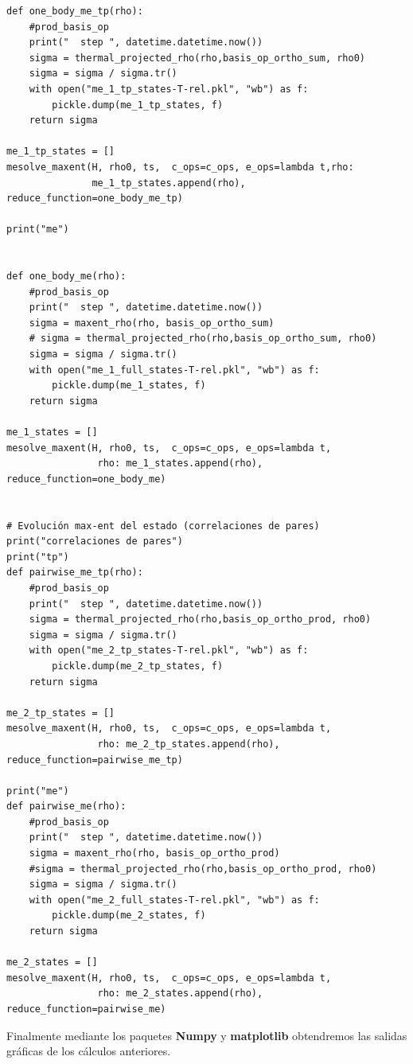 \documentclass{report} %
\numberwithin{equation}{section}
\begin{document}
\begin{verbatim}
def one_body_me_tp(rho):
    #prod_basis_op
    print("  step ", datetime.datetime.now())
    sigma = thermal_projected_rho(rho,basis_op_ortho_sum, rho0)
    sigma = sigma / sigma.tr()
    with open("me_1_tp_states-T-rel.pkl", "wb") as f:
        pickle.dump(me_1_tp_states, f)
    return sigma

me_1_tp_states = []
mesolve_maxent(H, rho0, ts,  c_ops=c_ops, e_ops=lambda t,rho:
               me_1_tp_states.append(rho), reduce_function=one_body_me_tp)

print("me")


def one_body_me(rho):
    #prod_basis_op
    print("  step ", datetime.datetime.now())
    sigma = maxent_rho(rho, basis_op_ortho_sum)
    # sigma = thermal_projected_rho(rho,basis_op_ortho_sum, rho0)
    sigma = sigma / sigma.tr()
    with open("me_1_full_states-T-rel.pkl", "wb") as f:
        pickle.dump(me_1_states, f)
    return sigma

me_1_states = []
mesolve_maxent(H, rho0, ts,  c_ops=c_ops, e_ops=lambda t,
                rho: me_1_states.append(rho), reduce_function=one_body_me)


# Evolución max-ent del estado (correlaciones de pares)
print("correlaciones de pares")
print("tp")
def pairwise_me_tp(rho):
    #prod_basis_op
    print("  step ", datetime.datetime.now())
    sigma = thermal_projected_rho(rho,basis_op_ortho_prod, rho0)
    sigma = sigma / sigma.tr()
    with open("me_2_tp_states-T-rel.pkl", "wb") as f:
        pickle.dump(me_2_tp_states, f)
    return sigma

me_2_tp_states = []
mesolve_maxent(H, rho0, ts,  c_ops=c_ops, e_ops=lambda t,
                rho: me_2_tp_states.append(rho), reduce_function=pairwise_me_tp)

print("me")
def pairwise_me(rho):
    #prod_basis_op
    print("  step ", datetime.datetime.now())
    sigma = maxent_rho(rho, basis_op_ortho_prod)
    #sigma = thermal_projected_rho(rho,basis_op_ortho_prod, rho0)
    sigma = sigma / sigma.tr()
    with open("me_2_full_states-T-rel.pkl", "wb") as f:
        pickle.dump(me_2_states, f)
    return sigma

me_2_states = []
mesolve_maxent(H, rho0, ts,  c_ops=c_ops, e_ops=lambda t,
                rho: me_2_states.append(rho), reduce_function=pairwise_me)
\end{verbatim}

Finalmente mediante los paquetes \textbf{Numpy} y \textbf{matplotlib} obtendremos las salidas gráficas de los cálculos anteriores. 
\end{document}

